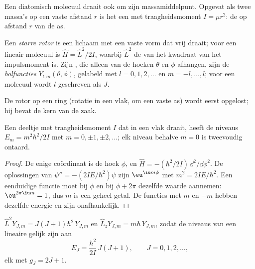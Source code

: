 Een diatomisch molecuul draait ook om zijn massamiddelpunt. Opgevat als
twee massa's op een vaste afstand $r$ is het een  met
traagheidsmoment
$I = \mu r^2$: de  op afstand $r$ van de as.

\begin{definition}\label{def:b3:quantum-model-systems:rotor}
Een \emph{starre rotor} is een lichaam met een vaste
vorm dat vrij draait; voor een lineair molecuul is $\hat H = \hat L^2/2I$, waarbij $\hat L^2$ de
 van het kwadraat van het impulsmoment is. Zijn , die
alleen van de hoeken $\theta$ en $\phi$ afhangen, zijn de
\emph{bolfuncties} $Y_{l,m}(\theta,\phi)$, gelabeld met $l =
0, 1, 2, \dots$ en $m = -l, \dots, l$; voor een molecuul wordt $l$
geschreven als $J$.
\end{definition}

De rotor op een ring (rotatie in een vlak, om een vaste as) wordt eerst
opgelost; hij bevat de kern van de zaak.

\begin{theorem}[De ring]\label{thm:b3:quantum-model-systems:ring}
Een deeltje met traagheidsmoment $I$ dat in een vlak draait, heeft de
niveaus
$E_m = m^2\hbar^2/2I$ met $m = 0, \pm1, \pm2, \dots$; elk niveau behalve $m = 0$
is tweevoudig ontaard.
\end{theorem}

\begin{proof}
De enige coördinaat is de hoek $\phi$, en $\hat H = -(\hbar^2/2I)\,
\dd^2/\dd\phi^2$. De oplossingen van $\psi'' = -(2IE/\hbar^2)\psi$ zijn $\eu^{\iu
m\phi}$ met $m^2 = 2IE/\hbar^2$. Een eenduidige functie moet bij $\phi$ en
bij $\phi + 2\pi$ dezelfde waarde aannemen: $\eu^{2\pi\iu m} = 1$, dus $m$
is een geheel getal.
De functies met $m$ en $-m$ hebben dezelfde energie en zijn onafhankelijk.
\end{proof}

\begin{theorem}\label{thm:b3:quantum-model-systems:rotor}
$\hat L^2Y_{J,m} = J(J+1)\hbar^2\,Y_{J,m}$ en $\hat L_zY_{J,m} = m\hbar\,
Y_{J,m}$, zodat de niveaus van een lineaire  gelijk zijn aan
\[
E_J = \frac{\hbar^2}{2I}\,J(J+1), \qquad J = 0, 1, 2, \dots,
\]
elk met  $g_J = 2J + 1$.
\end{theorem}
\admitted

